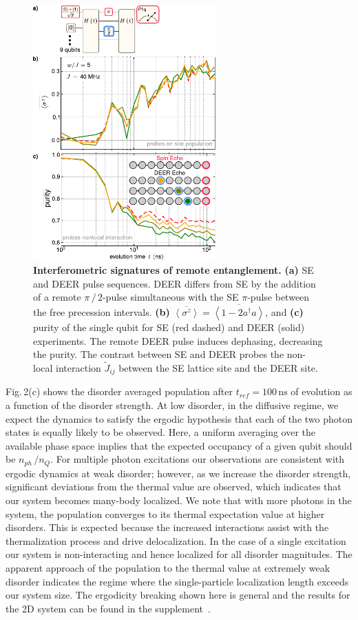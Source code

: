 \begin{figure}[t]
\includegraphics[width=70mm]{./PDF/fig_3.pdf}
\vspace{-0.7em}
\caption{\small
\textbf{Interferometric signatures of remote entanglement.}
\textbf{(a)} SE and DEER pulse sequences. DEER differs from SE by the addition of a remote $\pi\, /\,2$-pulse simultaneous with the SE $\pi$-pulse between the free precession intervals. \textbf{(b)}  $\overline{ \left< \sigma^z \right> } =\overline{ \left< 1 - 2 a^\dagger a \right> }$, and \textbf{(c)}  purity of the single qubit for SE (red dashed) and DEER (solid) experiments. The remote DEER pulse induces dephasing, decreasing the purity. The contrast between SE and DEER probes the non-local interaction $\widetilde{J}_{ij}$ between the SE lattice site and the DEER site.}
\end{figure}

Fig.\,2(c) shows the disorder averaged population after $t_{ref}=100\, \text{ns}$ of evolution as a function of the disorder strength. At low disorder, in the diffusive regime, we expect the dynamics to satisfy the ergodic hypothesis that each of the two photon states is equally likely to be observed. Here, a uniform averaging over the available phase space implies that the expected occupancy of a given qubit should be $n_{ph}\,/n_Q$. For multiple photon excitations our observations are consistent with ergodic dynamics at weak disorder; however, as we increase the disorder strength, significant deviations from the thermal value are observed, which indicates that our system becomes many-body localized. We note that with more photons in the system, the population converges to its thermal expectation value at higher disorders. This is expected because the increased interactions assist with the thermalization process and drive delocalization. In the case of a single excitation our system is non-interacting and hence localized for all disorder magnitudes. The apparent approach of the population to the thermal value at extremely weak disorder indicates the regime where the single-particle localization length exceeds our system size.  The ergodicity breaking shown here is general and the results for the 2D system can be found in the supplement\, \cite{supplement}.
